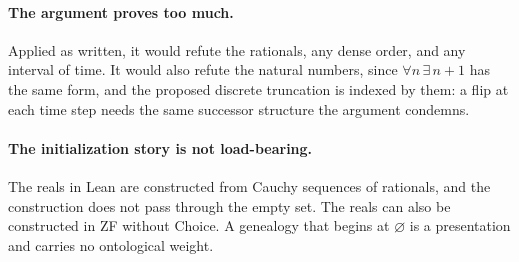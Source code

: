 \documentclass[11pt]{article}
\begin{document}
\paragraph{The argument proves too much.} Applied as written, it would refute the rationals, any dense order, and any interval of time. It would also refute the natural numbers, since $\forall n\,\exists\, n{+}1$ has the same form, and the proposed discrete truncation is indexed by them: a flip at each time step needs the same successor structure the argument condemns.

\paragraph{The initialization story is not load-bearing.} The reals in Lean are constructed from Cauchy sequences of rationals, and the construction does not pass through the empty set. The reals can also be constructed in ZF without Choice. A genealogy that begins at $\varnothing$ is a presentation and carries no ontological weight.
\end{document}
